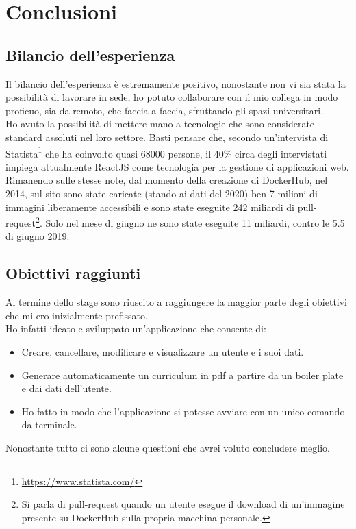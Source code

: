 \chapter{Conclusioni}



\section{Bilancio dell'esperienza}
Il bilancio dell'esperienza è estremamente positivo, nonostante non vi sia stata la possibilità di lavorare in sede, ho potuto collaborare con il mio collega in modo proficuo, sia da remoto, che faccia a faccia, sfruttando gli spazi universitari.
\\
Ho avuto la possibilità di mettere mano a tecnologie che sono considerate standard assoluti nel loro settore. Basti pensare che, secondo un'intervista di Statista\footnote{
\url{https://www.statista.com/}
} che ha coinvolto quasi 68000 persone, il 40\% circa degli intervistati impiega attualmente ReactJS come tecnologia per la gestione di applicazioni web.\cite{WDFUsage} Rimanendo sulle stesse note, dal momento della creazione di DockerHub, nel 2014, sul sito sono state caricate (stando ai dati del 2020) ben 7 milioni di immagini liberamente accessibili e sono state eseguite 242 miliardi di pull-request\footnote{
Si parla di pull-request quando un utente esegue il download di un'immagine presente su DockerHub sulla propria macchina personale.
}. Solo nel mese di giugno ne sono state eseguite 11 miliardi, contro le 5.5 di giugno 2019.\cite{DockerHubUsage}



\section{Obiettivi raggiunti}
Al termine dello stage sono riuscito a raggiungere la maggior parte degli obiettivi che mi ero inizialmente prefissato.
\\
Ho infatti ideato e sviluppato un'applicazione che consente di:
\begin{itemize}
    \item Creare, cancellare, modificare e visualizzare un utente e i suoi dati.
    \item Generare automaticamente un curriculum in pdf a partire da un boiler plate e dai dati dell'utente.
    \item Ho fatto in modo che l'applicazione si potesse avviare con un unico comando da terminale.
\end{itemize}
Nonostante tutto ci sono alcune questioni che avrei voluto concludere meglio.



